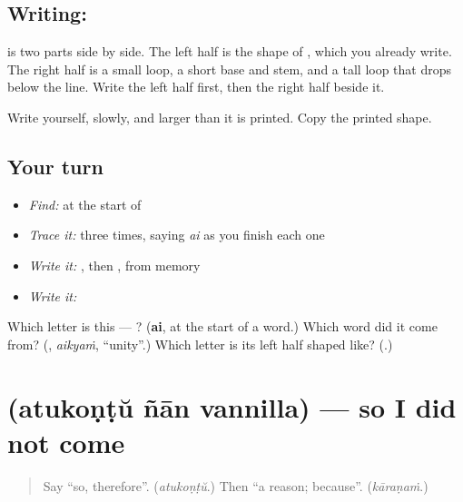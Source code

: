\subsection*{Writing: }
\textbf{} is two parts side by side. The left half is the shape of \textbf{}, which you already write. The right half is a small loop, a short base and stem, and a tall loop that drops below the line. Write the left half first, then the right half beside it.

Write \textbf{} yourself, slowly, and larger than it is printed. Copy the printed shape.

\subsection*{Your turn}
\begin{itemize}
\raggedright
  \item \emph{Find:}  at the start of \textbf{}
  \item \emph{Trace it:}  three times, saying \emph{ai} as you finish each one
  \item \emph{Write it:} , then , from memory
  \item \emph{Write it:} \textbf{}
\end{itemize}

\begin{tcolorbox}[breakable,colback=teal!4,colframe=teal!35!black,title={Before you move on}]
Which letter is this — ? (\textbf{ai}, at the start of a word.) Which word did it come from? (\textbf{}, \emph{aikyaṁ}, \textquotedblleft{}unity\textquotedblright{}.) Which letter is its left half shaped like? (\textbf{}.)
\end{tcolorbox}
\section[\texorpdfstring{\ml{അതുകൊണ്ട്} \ml{ഞാൻ} \ml{വന്നില്ല} (atukoṇṭŭ ñān …)}{അതുകൊണ്ട് ഞാൻ വന്നില്ല (atukoṇṭŭ ñān …)}]{   (atukoṇṭŭ ñān vannilla) — so I did not come}

\label{lesson:ML-C341-atukondu}



\begin{quote}
Say \textquotedblleft{}so, therefore\textquotedblright{}. (\emph{atukoṇṭŭ}.) Then \textquotedblleft{}a reason; because\textquotedblright{}. (\emph{kāraṇaṁ}.)
\end{quote}


